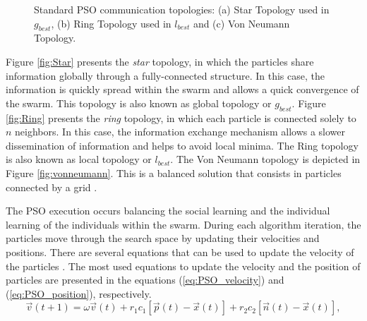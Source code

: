 \begin{figure}[!h]
\caption{Standard PSO communication topologies: (a) Star Topology used in $g_{best}$, (b) Ring Topology used in $l_{best}$ and (c) Von Neumann Topology.}
\label{fig:topologies}
\end{figure}

Figure \ref{fig:Star} presents the \emph{star} topology, in which the particles share information globally through a fully-connected structure. In this case, the information is quickly spread within the swarm and allows a quick convergence of the swarm. This topology is also known as global topology or $g_{best}$. Figure \ref{fig:Ring} presents the \emph{ring} topology, in which each particle is connected solely to $n$ neighbors. In this case, the information exchange mechanism allows a slower dissemination of information and helps to avoid local minima. The Ring topology is also known as local topology or $l_{best}$. The Von Neumann topology is depicted in Figure \ref{fig:vonneumann}. This is a balanced solution that consists in particles connected by a grid \cite{ClanPSO:Carvalho2009}.

The PSO execution occurs balancing the social learning and the individual learning of the individuals within the swarm. During each algorithm iteration, the particles move through the search space by updating their velocities and positions. There are several equations that can be used to update the velocity of the particles \cite{PSO:Clerc2002}. The most used equations to update the velocity and the position of particles are presented in the equations (\ref{eq:PSO_velocity}) and (\ref{eq:PSO_position}), respectively.
\begin{equation}\label{eq:PSO_velocity}
\vec v(t+1) = \omega \vec v(t) + r_1c_1[\vec p(t) - \vec x(t)] + r_2c_2[\vec n(t) - \vec x(t)],
\end{equation}

